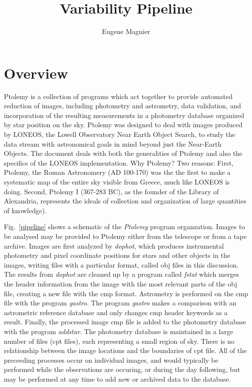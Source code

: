 \documentclass{article}
\title{Variability Pipeline}
\author{Eugene Magnier}
\newcommand\pr{\em}                   %
\newcommand\ty{\sc}                   %
\begin{document}
\maketitle

\section{Overview}

Ptolemy is a collection of programs which act together to provide
automated reduction of images, including photometry and astrometry,
data validation, and incorporation of the resulting measurements in a
photometry database organized by star position on the sky.  Ptolemy
was designed to deal with images produced by LONEOS, the Lowell
Observatory Near Earth Object Search, to study the data stream with
astronomical goals in mind beyond just the Near-Earth Objects.  The
document deals with both the generalities of Ptolemy and also the
specifics of the LONEOS implementation.  Why Ptolemy?  Two reasons:
First, Ptolemy, the Roman Astronomery (AD 100-170) was the the first
to make a systematic map of the entire sky visible from Greece, much
like LONEOS is doing.  Second, Ptolemy I (367-283 BC), as the founder
of the Library of Alexandria, represents the ideals of collection and
organization of large quantities of knowledge).

Fig.~\ref{pipeline} shows a schematic of the {\pr Ptolemy} program
organzation.  Images to be analysed may be provided to Ptolemy either
from the telescope or from a tape archive.  Images are first analyzed
by {\pr dophot}, which produces instrumental photometry and pixel
coordinate positions for stars and other objects in the images,
writing files with a particular format, called {\ty obj} files in this
discussion.  The results from {\pr dophot} are cleaned up by a program
called {\pr fstat} which merges the header information from the image
with the most relevant parts of the {\ty obj} file, creating a new
file with the {\ty cmp} format.  Astrometry is performed on the {\ty
cmp} file with the program {\pr gastro}.  The program {\pr gastro}
makes a comparison with an astrometric reference database and only
changes {\ty cmp} header keywords as a result.  Finally, the processed
image {\ty cmp} file is added to the photometry database with the
program {\pr addstar}.  The photometry database is maintained in a
large number of files ({\ty cpt} files), each representing a small
region of sky.  There is no relationship between the image locations
and the boundaries of {\ty cpt} file.  All of the preceeding processes
occur on individual images, and would typically be performed while the
observations are occuring, or during the day following, but may be
performed at any time to add new or archived data to the database.
\end{document}
